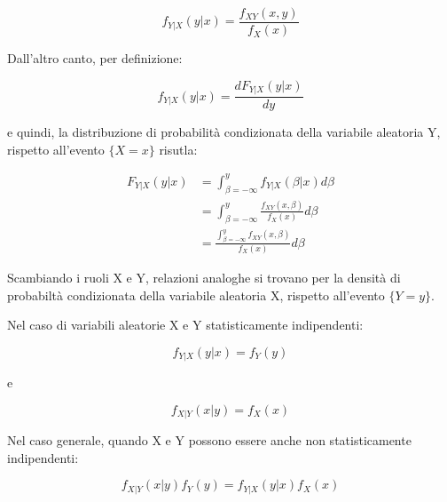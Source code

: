 {
    \Large 
    \begin{equation}
        f_{Y | X} (y | x)
        = 
        \frac{f_{XY} (x, y)}{f_X (x)}
    \end{equation}
}

Dall'altro canto, per definizione: 

{
    \Large 
    \begin{equation}
        f_{Y | X} (y | x)
        = 
        \frac{d F_{Y|X} (y | x)}{dy}
    \end{equation}
}


e quindi, la distribuzione di probabilità condizionata della variabile aleatoria Y, rispetto all'evento $\{ X = x\}$ risutla: 

{
    \Large 
    \begin{equation}
        \begin{split}
            F_{Y | X} (y | x) 
            &= 
            \int_{\beta = -\infty}^{y}
            f_{Y | X} (\beta | x) d\beta 
            \\ 
            &= 
            \int_{\beta = -\infty}^{y}
            \frac{f_{XY} (x, \beta)}{f_X (x)} 
            d\beta 
            \\ 
            &=
            \frac{ 
            \int_{\beta = -\infty}^{y}
            f_{XY} (x, \beta)} 
            {f_X (x)} 
            d\beta
        \end{split}
    \end{equation}
}

Scambiando i ruoli X e Y, relazioni analoghe si trovano per la densità di probabiltà condizionata della variabile aleatoria X, rispetto all'evento $\{ Y = y\}$. \newline 

Nel caso di variabili aleatorie X e Y statisticamente indipendenti:

{
    \Large 
    \begin{equation}
        f_{Y | X} (y | x) = f_Y (y)
    \end{equation}
}

e 

{
    \Large 
    \begin{equation}
        f_{X | Y} (x | y) = f_X (x)
    \end{equation}
}

Nel caso generale, quando X e Y possono essere anche non statisticamente indipendenti: 

{
    \Large 
    \begin{equation}
        f_{X | Y} (x | y) f_Y (y)
        = 
        f_{Y | X} (y | x) f_X (x)
    \end{equation}
}

